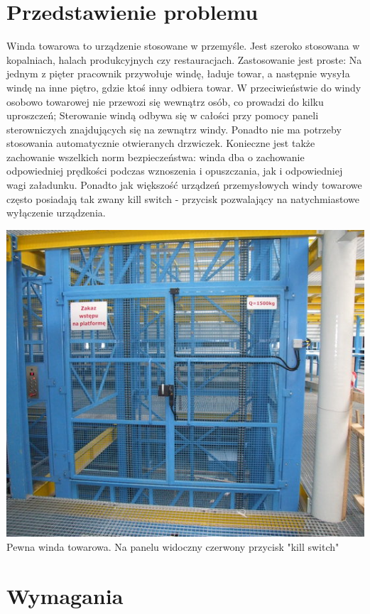 \documentclass[a4paper,11pt]{article}
\begin{document}
\section{Przedstawienie problemu}

Winda towarowa to urządzenie stosowane w przemyśle. 
Jest szeroko stosowana w kopalniach, halach produkcyjnych czy restauracjach.
Zastosowanie jest proste: Na jednym z pięter pracownik
przywołuje windę, ładuje towar, a następnie wysyła windę na inne piętro, gdzie ktoś inny odbiera towar.
W przeciwieństwie do windy osobowo towarowej nie przewozi się wewnątrz osób, co prowadzi do kilku uproszczeń;
Sterowanie windą odbywa się w całości przy pomocy paneli sterowniczych znajdujących się na zewnątrz windy. 
Ponadto nie ma potrzeby stosowania automatycznie otwieranych drzwiczek. 
Konieczne jest także zachowanie wszelkich norm bezpieczeństwa: winda dba o zachowanie odpowiedniej prędkości podczas wznoszenia i opuszczania, jak i odpowiedniej wagi załadunku.
Ponadto jak większość urządzeń przemysłowych 
windy towarowe często posiadają tak zwany kill switch - przycisk pozwalający na natychmiastowe wyłączenie urządzenia. 
\begin{center} 
\includegraphics{images/elevator.png} \\Pewna winda towarowa. Na panelu widoczny czerwony przycisk "kill switch"\\ 
\end{center} 
\section{Wymagania}
\end{document}

